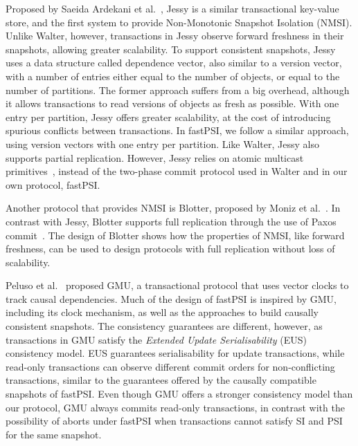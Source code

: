 Proposed by Saeida Ardekani et al.~\citep{ardekani_nmsi}, Jessy is a similar transactional key-value store, and the first system to provide Non-Monotonic Snapshot Isolation (NMSI). Unlike Walter, however, transactions in Jessy observe forward freshness in their snapshots, allowing greater scalability. To support consistent snapshots, Jessy uses a data structure called dependence vector, also similar to a version vector, with a number of entries either equal to the number of objects, or equal to the number of partitions. The former approach suffers from a big overhead, although it allows transactions to read versions of objects as fresh as possible. With one entry per partition, Jessy offers greater scalability, at the cost of introducing spurious conflicts between transactions. In fastPSI, we follow a similar approach, using version vectors with one entry per partition. Like Walter, Jessy also supports partial replication. However, Jessy relies on atomic multicast primitives~\citep{guerraoui_multicast}, instead of the two-phase commit protocol used in Walter and in our own protocol, fastPSI.

Another protocol that provides NMSI is Blotter, proposed by Moniz et al.~\citep{moniz_blotter}. In contrast with Jessy, Blotter supports full replication through the use of Paxos commit~\citep{gray_paxos_commit}. The design of Blotter shows how the properties of NMSI, like forward freshness, can be used to design protocols with full replication without loss of scalability.

Peluso et al.~\citep{peluso_gmu} proposed GMU, a transactional protocol that uses vector clocks to track causal dependencies. Much of the design of fastPSI is inspired by GMU, including its clock mechanism, as well as the approaches to build causally consistent snapshots. The consistency guarantees are different, however, as transactions in GMU satisfy the \emph{Extended Update Serialisability} (EUS)~\citep{hansdah_update_ser, adya_thesis} consistency model. EUS guarantees serialisability for update transactions, while read-only transactions can observe different commit orders for non-conflicting transactions, similar to the guarantees offered by the causally compatible snapshots of fastPSI. Even though GMU offers a stronger consistency model than our protocol, GMU always commits read-only transactions, in contrast with the possibility of aborts under fastPSI when transactions cannot satisfy SI and PSI for the same snapshot.
